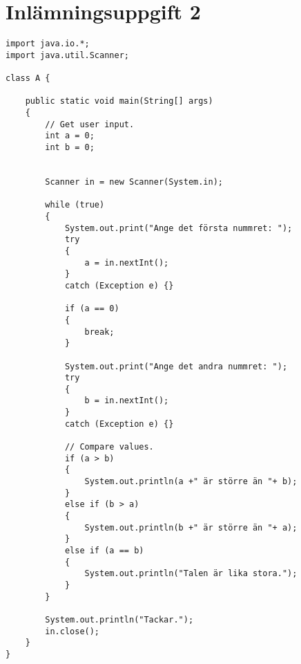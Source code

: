 \documentclass[a4paper,12pt]{article}
\begin{document}
\section{\textsf{Inlämningsuppgift 2}}
\begin{verbatim}
import java.io.*;
import java.util.Scanner;

class A {

    public static void main(String[] args)
    {
        // Get user input.
        int a = 0;
        int b = 0;


        Scanner in = new Scanner(System.in);

        while (true)
        {
            System.out.print("Ange det första nummret: ");
            try
            {
                a = in.nextInt();
            }
            catch (Exception e) {}

            if (a == 0)
            {
                break;
            }

            System.out.print("Ange det andra nummret: ");
            try
            {
                b = in.nextInt();
            }
            catch (Exception e) {}

            // Compare values.
            if (a > b)
            {
                System.out.println(a +" är större än "+ b);
            }
            else if (b > a)
            {
                System.out.println(b +" är större än "+ a);
            }
            else if (a == b)
            {
                System.out.println("Talen är lika stora.");
            }
        }

        System.out.println("Tackar.");
        in.close();
    }
}
\end{verbatim}


\newpage
\end{document}
